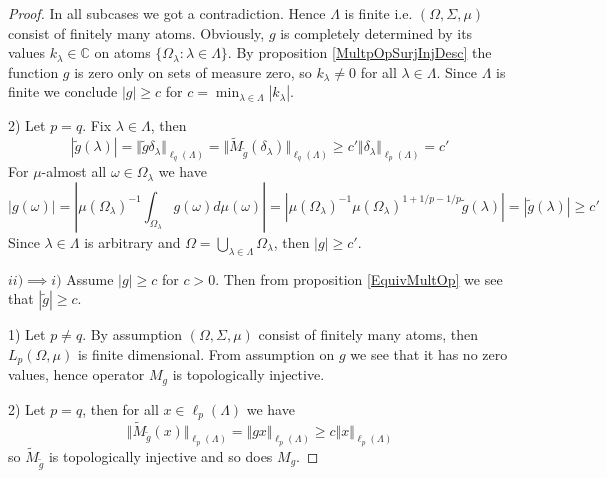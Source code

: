 \begin{proof}
In all subcases we got a contradiction. Hence $\Lambda$ is finite i.e. $(\Omega,\Sigma,\mu)$ consist of finitely many atoms. Obviously,
$g$ is completely determined by its values $k_\lambda\in\mathbb{C}$ on atoms $\{\Omega_\lambda:\lambda\in\Lambda\}$. By proposition \ref{MultpOpSurjInjDesc} the function $g$ is zero only on sets of measure zero, so $k_\lambda\neq 0$ for all $\lambda\in\Lambda$. Since $\Lambda$ is finite we conclude $|g|\geq c$ for $c=\min_{\lambda\in\Lambda}|k_\lambda|$. 


2) Let $p=q$. Fix $\lambda\in\Lambda$, then
$$
|\widetilde{g}(\lambda)|
=\Vert \widetilde{g} \delta_\lambda\Vert_{\ell_q(\Lambda)}
=\Vert \widetilde{M}_{\widetilde{g}}(\delta_\lambda)\Vert_{\ell_q(\Lambda)}
\geq c'\Vert \delta_\lambda\Vert_{\ell_p(\Lambda)}
=c'
$$
For $\mu$-almost all $\omega\in\Omega_\lambda$ we have
$$
|g(\omega)|
=\left|\mu(\Omega_\lambda)^{-1}\int_{\Omega_\lambda}g(\omega)d\mu(\omega)\right|
=\left|\mu(\Omega_\lambda)^{-1}\mu(\Omega_\lambda)^{1+1/p-1/p}\widetilde{g}(\lambda)\right|
=|\widetilde{g}(\lambda)|\geq c'
$$
Since $\lambda\in\Lambda$ is arbitrary and $\Omega=\bigcup_{\lambda\in\Lambda}\Omega_\lambda$, then $|g|\geq c'$.



$ii)$$\implies$$ i)$ Assume $|g|\geq c$ for $c>0$. Then from proposition \ref{EquivMultOp} we see that $|\widetilde{g}|\geq c$.

1) Let $p\neq q$. By assumption $(\Omega,\Sigma,\mu)$ consist of finitely many atoms, then $L_p(\Omega,\mu)$ is finite dimensional. From assumption on $g$ we see that it has no zero values, hence operator $M_g$ is topologically injective. 

2) Let $p=q$, then for all $x\in\ell_p(\Lambda)$ we have
$$
\Vert \widetilde{M}_{\widetilde{g}}(x)\Vert_{\ell_p(\Lambda)}=\Vert g x\Vert_{\ell_p(\Lambda)}\geq c\Vert x\Vert_{\ell_p(\Lambda)}
$$
so $\widetilde{M}_{\widetilde{g}}$ is topologically injective and so does $M_g$.
\end{proof}

